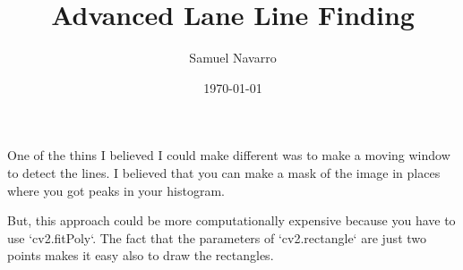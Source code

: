 \documentclass[11pt, a4paper]{article}
\begin{document}
\title{Advanced Lane Line Finding}
\author{Samuel Navarro}
\date{\today}
\maketitle
	



One of the thins I believed I could make different was to make a moving window to detect the lines. I believed that you can make a mask of the image in places where you got peaks in your histogram.

But, this approach could be more computationally expensive because you have to use `cv2.fitPoly`. The fact that the parameters of `cv2.rectangle` are just two points makes it easy also to draw the rectangles.
\end{document}
